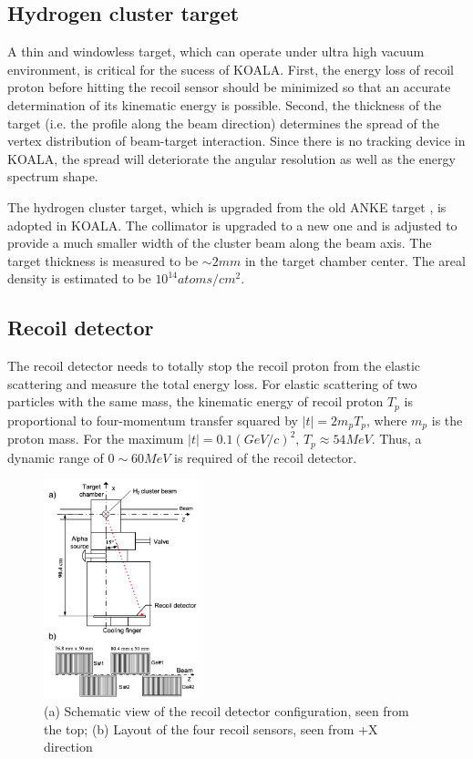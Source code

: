 \documentclass[number,5p]{elsarticle}
\begin{document}
\subsection{Hydrogen cluster target}
\label{sec:target}

A thin and windowless target, which can operate under ultra high vacuum
environment, is critical for the sucess of KOALA.
First, the energy loss of recoil proton before hitting the recoil sensor should
be minimized so that an accurate determination of its kinematic energy is possible.
Second, the thickness of the target (i.e. the profile along the beam direction) determines
the spread of the vertex distribution of beam-target interaction.
Since there is no tracking device in KOALA, the spread will deteriorate the
angular resolution as well as the energy spectrum shape.

The hydrogen cluster target, which is upgraded from the old ANKE target \cite{cluster_target}, is adopted in KOALA.
The collimator is upgraded to a new one and is adjusted to provide a much
smaller width of the cluster beam along the beam axis.
The target thickness is measured to be $\sim2 mm$ in the target chamber center.
The areal density is estimated to be $10^{14} atoms/cm^2$.

\subsection{Recoil detector}
\label{sec:recoil}

The recoil detector needs to totally stop the recoil proton from the
elastic scattering and measure the total energy loss.
For elastic scattering of two particles with the same mass,
the kinematic energy of recoil proton \(T_p\) is proportional to four-momentum
transfer squared by \(|t| = 2m_pT_p\), where \(m_p\) is the proton mass.
For the maximum $|t|=0.1 (GeV/c)^2$, \(T_p \approx 54 MeV\). Thus, a dynamic range of
$0\sim60 MeV$ is required of the recoil detector.

\begin{figure}[htbp]
  \centering
  \includegraphics[width=0.4\textwidth]{./recoil_schematic.png}
  \caption{(a) Schematic view of the recoil detector configuration, seen from the
    top; (b) Layout of the four recoil sensors, seen from +X direction}
  \label{fig:recoil_schematic}
\end{figure}
\end{document}
